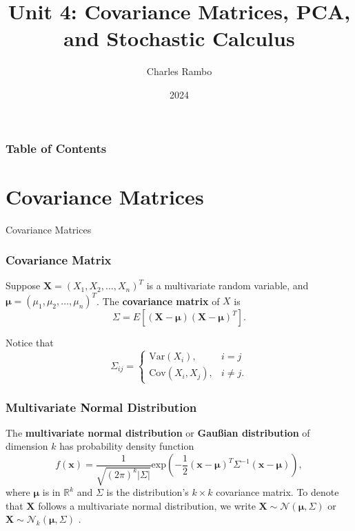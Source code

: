\documentclass{beamer}
\title{Unit 4: Covariance Matrices, PCA, and Stochastic Calculus}
\author{Charles Rambo}
\institute{UCLA Anderson}
\date{2024}
\begin{document}



\frame{\titlepage}

\begin{frame}[allowframebreaks]

\frametitle{Table of Contents}
\tableofcontents
\end{frame}


\section{Covariance Matrices}

\begin{frame}
\begin{center}
\Huge Covariance Matrices
\end{center}
\end{frame}

\begin{frame}
\frametitle{Covariance Matrix}
\small
\begin{Definition}
Suppose ${\boldsymbol X} = \left(X_1, X_2,\ldots, X_n\right)^T$ is a multivariate random variable, and ${\boldsymbol \mu} = (\mu_1, \mu_2,\ldots,\mu_n)^T$. The {\bf covariance matrix} of $X$ is
$$
\Sigma = E\left[({\boldsymbol X} - {\boldsymbol \mu}) ({\boldsymbol X} - {\boldsymbol \mu})^T\right].
$$
\end{Definition}
Notice that
$$
\Sigma_{ij} = \begin{cases} \text{Var}(X_i),	& i = j\\ \text{Cov}(X_i, X_j),	&	i\neq j.\end{cases}
$$
\end{frame}

\begin{frame}
\frametitle{Multivariate Normal Distribution}
\begin{Definition}
The {\bf multivariate normal distribution} or {\bf Gau\ss ian distribution} of dimension $k$ has probability density function
$$
f({\boldsymbol x}) = \frac{1}{\sqrt{ (2\pi)^k |\Sigma|}} \text{exp}\left(-\frac{1}{2}\left({\boldsymbol x} - {\boldsymbol \mu}\right)^T\Sigma^{-1}({\boldsymbol x} - {\boldsymbol \mu})\right),
$$
where $ {\boldsymbol \mu}$ is in $\mathbb{R}^k$ and $\Sigma$ is the distribution's $k\times k$ covariance matrix. To denote that $ {\boldsymbol X}$ follows a multivariate normal distribution, we write $ {\boldsymbol X}\sim{\mathcal{N}( {\boldsymbol \mu}, \Sigma)}$ or $ {\boldsymbol X}\sim{\mathcal{N}_k({\boldsymbol \mu}, \Sigma)}$ .
\end{Definition}

\end{frame}
\end{document}
